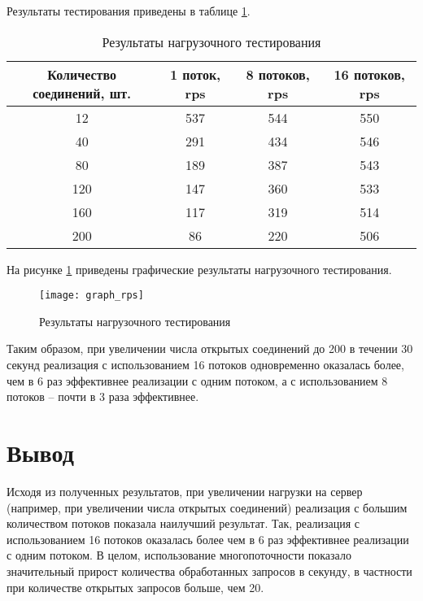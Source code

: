 Результаты тестирования приведены в таблице \ref{tbl:rps}.
\begin{table}[h]
	\begin{center}
		\begin{threeparttable}
		\caption{Результаты нагрузочного тестирования}
		\label{tbl:rps}
		\begin{tabular}{|c|c|c|c|}
			\hline
			Количество соединений, шт.& 1 поток, rps&  8 потоков, rps &  16 потоков, rps \\
			\hline
			12 & 537 & 544 & 550 \\ 
			\hline
			40 & 291 & 434 & 546 \\ 
			\hline
			80 & 189 & 387 & 543 \\ 
			\hline
			120 & 147 & 360 & 533 \\ 
			\hline
			160 & 117 & 319 & 514 \\ 
			\hline
			200 & 86 & 220 & 506 \\ 
			\hline
		\end{tabular}
		\end{threeparttable}
    \end{center}
\end{table}

На рисунке \ref{img:graph_rps} приведены графические результаты нагрузочного тестирования.

\begin{figure}[h]
	\begin{center}
		\texttt{[image: graph\_rps]}
	\end{center}
	\caption{Результаты нагрузочного тестирования}
	\label{img:graph_rps}
\end{figure}
Таким образом, при увеличении числа открытых соединений до 200 в течении 30 секунд реализация с использованием 16 потоков одновременно оказалась более, чем в 6 раз эффективнее реализации с одним потоком, а с использованием 8 потоков -- почти в 3 раза эффективнее.

\section*{Вывод}
Исходя из полученных результатов, при увеличении нагрузки на сервер (например, при увеличении числа открытых соединений) реализация с большим количеством потоков показала наилучший результат. Так, реализация с использованием 16 потоков оказалась более чем в 6 раз эффективнее реализации с одним потоком.
В целом, использование многопоточности показало значительный прирост количества обработанных запросов в секунду, в частности при количестве открытых запросов больше, чем 20.